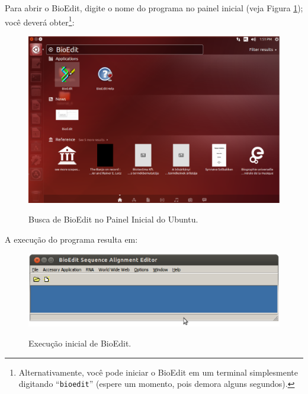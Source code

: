 \begin{refsection}
Para abrir o BioEdit, digite o nome do programa no painel inicial (veja Figura \ref{tut7:fig:bioedit}); você deverá obter\footnote{Alternativamente, você pode iniciar o BioEdit em um terminal simplesmente digitando ``\texttt{bioedit}'' (espere um momento, pois demora alguns segundos).}:\\

  \begin{figure}[H]
       \centering
      {\includegraphics[scale=0.3]{figures/tut7/bioedit.eps}}
	{\caption[Bioedit: busca no Ubuntu]{Busca de BioEdit no Painel Inicial do Ubuntu.}\label{tut7:fig:bioedit}}
  \end{figure}


A execução do programa resulta em:

  \begin{figure}[H]
       \centering
      {\includegraphics[scale=0.5]{figures/tut7/bioedit_2.eps}}
	{\caption[Bioedit]{Execução inicial de BioEdit.}\label{tut7:fig:bioedit_2}}
  \end{figure}


\end{refsection}
